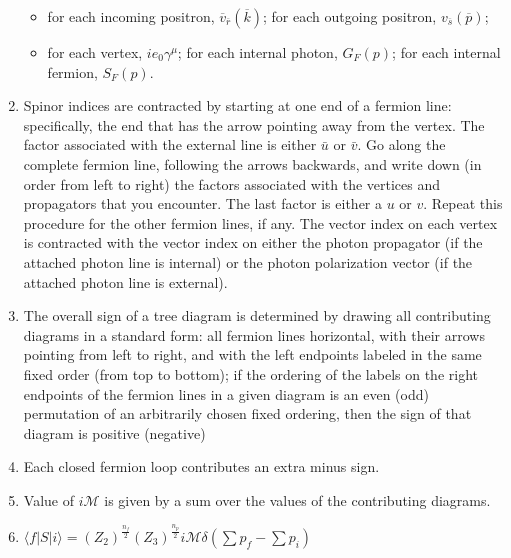 \documentclass[cyan]{elegantnote}
\begin{document}
\begin{enumerate}
\begin{itemize}
\item for each incoming positron, $\overline{v}_{\overline{r}}(\overline{k})$; for each outgoing positron, $v_{\overline{s}}(\overline{p})$;
\item for each vertex, $ie_0 \gamma^{\mu}$;
for each internal photon, $G_F(p)$;
for each internal fermion, $S_F(p)$.
\end{itemize}
\item Spinor indices are contracted by starting at one end of a fermion line: specifically, the end that has the arrow pointing away from the vertex. The factor associated with the external line is either $\bar{u}$ or $\bar{v}$. Go along the complete fermion line, following the arrows backwards, and write down (in order from left to right) the factors associated with the vertices and propagators that you encounter. The last factor is either a $u$ or $v$. Repeat this procedure for the other fermion lines, if any. The vector index on each vertex is contracted with the vector index on either the photon propagator (if the attached photon line is internal) or the
photon polarization vector (if the attached photon line is external).
\item The overall sign of a tree diagram is determined by drawing all contributing diagrams in a standard form: all fermion lines horizontal, with their arrows pointing from left to right, and with the left endpoints labeled in the same fixed order (from top to bottom); if the ordering of the labels on the right endpoints of the fermion lines in a given diagram is an even (odd) permutation of an arbitrarily chosen fixed ordering, then the sign of that diagram is positive (negative)
\item Each closed fermion loop contributes an extra minus sign.
\item Value of $i\mathcal{M}$ is given by a sum over the values of the contributing diagrams.
\item $\langle f | S | i \rangle = (Z_2)^{\frac{n_f}{2}} (Z_3)^{\frac{n_p}{2}} i\mathcal{M}\delta(\sum p_f -\sum p_i)$
\end{enumerate}
\end{document}
